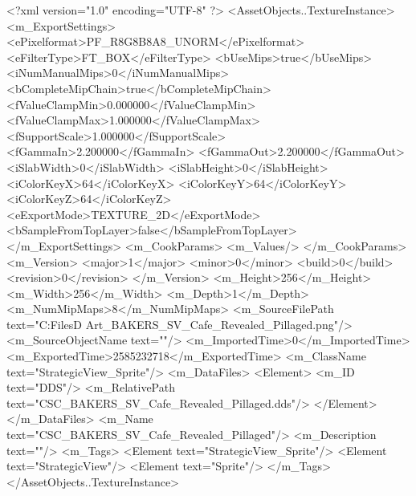 <?xml version="1.0" encoding="UTF-8" ?>
<AssetObjects..TextureInstance>
	<m_ExportSettings>
		<ePixelformat>PF_R8G8B8A8_UNORM</ePixelformat>
		<eFilterType>FT_BOX</eFilterType>
		<bUseMips>true</bUseMips>
		<iNumManualMips>0</iNumManualMips>
		<bCompleteMipChain>true</bCompleteMipChain>
		<fValueClampMin>0.000000</fValueClampMin>
		<fValueClampMax>1.000000</fValueClampMax>
		<fSupportScale>1.000000</fSupportScale>
		<fGammaIn>2.200000</fGammaIn>
		<fGammaOut>2.200000</fGammaOut>
		<iSlabWidth>0</iSlabWidth>
		<iSlabHeight>0</iSlabHeight>
		<iColorKeyX>64</iColorKeyX>
		<iColorKeyY>64</iColorKeyY>
		<iColorKeyZ>64</iColorKeyZ>
		<eExportMode>TEXTURE_2D</eExportMode>
		<bSampleFromTopLayer>false</bSampleFromTopLayer>
	</m_ExportSettings>
	<m_CookParams>
		<m_Values/>
	</m_CookParams>
	<m_Version>
		<major>1</major>
		<minor>0</minor>
		<build>0</build>
		<revision>0</revision>
	</m_Version>
	<m_Height>256</m_Height>
	<m_Width>256</m_Width>
	<m_Depth>1</m_Depth>
	<m_NumMipMaps>8</m_NumMipMaps>
	<m_SourceFilePath text="C:\Users\Shadow\Desktop\Working Files\2D Art\Quarters\Bakers\StrategicView\CSC_BAKERS_SV_Cafe_Revealed_Pillaged.png"/>
	<m_SourceObjectName text=""/>
	<m_ImportedTime>0</m_ImportedTime>
	<m_ExportedTime>2585232718</m_ExportedTime>
	<m_ClassName text="StrategicView_Sprite"/>
	<m_DataFiles>
		<Element>
			<m_ID text="DDS"/>
			<m_RelativePath text="CSC_BAKERS_SV_Cafe_Revealed_Pillaged.dds"/>
		</Element>
	</m_DataFiles>
	<m_Name text="CSC_BAKERS_SV_Cafe_Revealed_Pillaged"/>
	<m_Description text=""/>
	<m_Tags>
		<Element text="StrategicView_Sprite"/>
		<Element text="StrategicView"/>
		<Element text="Sprite"/>
	</m_Tags>
</AssetObjects..TextureInstance>

